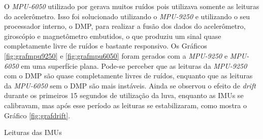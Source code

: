 O \textit{MPU-6050} utilizado por  gerava muitos ruídos pois utilizava somente as leituras do acelerômetro. Isso foi solucionado utilizando o \textit{MPU-9250} e utilizando o seu processador interno, o \ac{DMP}, para realizar a fusão dos dados do acelerômetro, giroscópio e magnetômetro embutidos, o que produziu um sinal quase completamente livre de ruídos e bastante responsivo. Os Gráficos \ref{fig:grafmpu9250} e \ref{fig:grafmpu6050} foram gerados com a \textit{MPU-9250} e \textit{MPU-6050} em uma superfície plana. Pode-se perceber que as leituras da \textit{MPU-9250} com o \ac{DMP} são quase completamente livres de ruídos, enquanto que as leituras da \textit{MPU-6050} sem o \ac{DMP} são mais instáveis. Ainda se observou o efeito de \textit{drift} durante os primeiros 15 segundos de utilização da luva, enquanto as \ac{IMU}s se calibravam, mas após esse período as leituras se estabilizaram, como mostra o Gráfico \ref{fig:grafdrift}.

\begin{grafico}[H]
  \setlength{\abovecaptionskip}{0pt}
  \setlength{\belowcaptionskip}{0pt}
  \caption[Leituras das \ac{IMU}s]{Leituras das \ac{IMU}s}
  \centering
  \\
  \captionsetup{justification=centering}
  \label{fig:graf_mpu}
\end{grafico}

